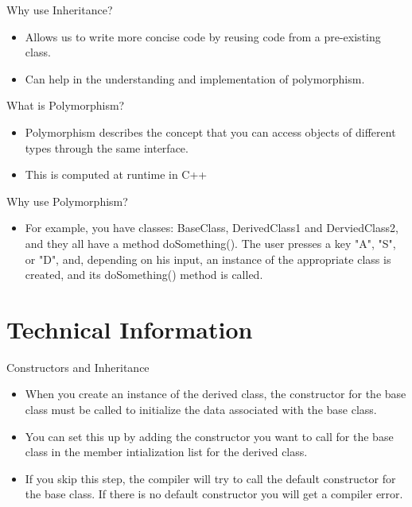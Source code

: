 \documentclass{beamer}
\begin{document}
\begin{frame}{Why use Inheritance?}
    \begin{itemize} 
    \item Allows us to write more concise code by reusing code from a pre-existing class.
    \item Can help in the understanding and implementation of polymorphism.
    \end{itemize}
    \end{frame}


\begin{frame}{What is Polymorphism?}
    \begin{itemize} 
    \item Polymorphism describes the concept that you can 
    access objects of different types through the same interface.
    \item This is computed at runtime in C++
    \end{itemize}
\end{frame}


\begin{frame}{Why use Polymorphism?}
    \begin{itemize} 
    \item For example, you have classes: BaseClass, DerivedClass1 and DerviedClass2, and they 
    all have a method doSomething(). The user presses a key "A", "S", or "D", and,
    depending on his input, an instance of the appropriate class is created, and
    its doSomething() method is called.
    \end{itemize}
\end{frame}


\section{Technical Information}
\begin{frame}{Constructors and Inheritance}
    \begin{itemize}
        \item When you create an instance of the derived class, the constructor for the base class
        must be called to initialize the data associated with the base class.
        \item You can set this up by adding the constructor you want to call for the base class in
        the member intialization list for the derived class.
        \item If you skip this step, the compiler will try to call the default constructor for the base class. 
        If there is no default constructor you will get a compiler error.  
    \end{itemize}
\end{frame}
\end{document}
